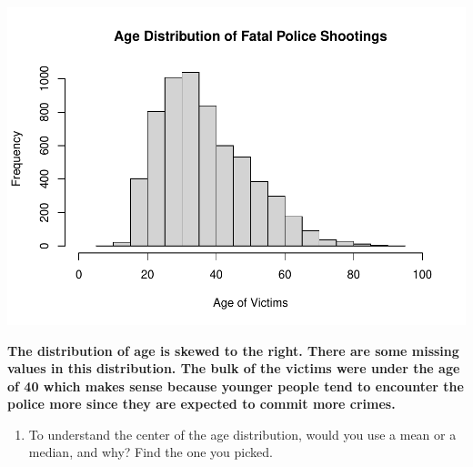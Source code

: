 \documentclass[
]{article}
\newenvironment{Shaded}{\begin{snugshade}}{\end{snugshade}}
\newcommand{\AttributeTok}[1]{\textcolor[rgb]{0.77,0.63,0.00}{#1}}
\newcommand{\DecValTok}[1]{\textcolor[rgb]{0.00,0.00,0.81}{#1}}
\newcommand{\FunctionTok}[1]{\textcolor[rgb]{0.00,0.00,0.00}{#1}}
\newcommand{\NormalTok}[1]{#1}
\newcommand{\SpecialCharTok}[1]{\textcolor[rgb]{0.00,0.00,0.00}{#1}}
\newcommand{\StringTok}[1]{\textcolor[rgb]{0.31,0.60,0.02}{#1}}
\providecommand{\tightlist}{%
  \setlength{\itemsep}{0pt}\setlength{\parskip}{0pt}}
\begin{document}
\begin{Shaded}
\end{Shaded}

\includegraphics{Assignments_files/figure-latex/unnamed-chunk-21-1.pdf}

\textbf{The distribution of age is skewed to the right. There are some
missing values in this distribution. The bulk of the victims were under
the age of 40 which makes sense because younger people tend to encounter
the police more since they are expected to commit more crimes.}

\begin{enumerate}
\def\labelenumi{\alph{enumi}.}
\setcounter{enumi}{1}
\tightlist
\item
  To understand the center of the age distribution, would you use a mean
  or a median, and why? Find the one you picked.
\end{enumerate}

\begin{Shaded}
\end{Shaded}
\end{document}
